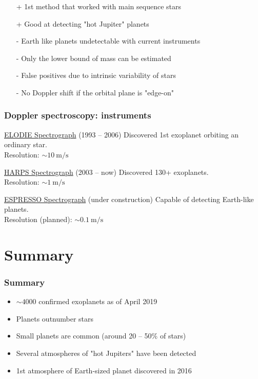 \documentclass{beamer}
\begin{document}
\begin{frame}
\begin{itemize}
\item[+] 1st method that worked with main sequence stars
\item[+] Good at detecting "hot Jupiter" planets
\item[-] Earth like planets undetectable with current instruments
\item[-] Only the lower bound of mass can be estimated
\item[-] False positives due to intrinsic variability of stars
\item[-] No Doppler shift if the orbital plane is "edge-on"
\end{itemize}
\end{frame}

\begin{frame}
\frametitle{Doppler spectroscopy: instruments}
\begin{block}{\href{http://www.obs-hp.fr/guide/elodie/elodie-eng.html}{ELODIE Spectrograph} (1993 -- 2006)}
Discovered 1st exoplanet orbiting an ordinary star. \\
Resolution: $\sim 10 \: \mathrm{m/s}$
\end{block}
\begin{block}{\href{https://www.eso.org/sci/facilities/lasilla/instruments/harps.html}{%
HARPS Spectrograph} (2003 -- now)}
Discovered 130+ exoplanets. \\
Resolution: $\sim 1 \: \mathrm{m/s}$
\end{block}
\begin{block}{\href{https://www.eso.org/sci/facilities/paranal/instruments/espresso.html}{%
ESPRESSO Spectrograph} (under construction)}
Capable of detecting Earth-like planets. \\
Resolution (planned): $\sim 0.1 \: \mathrm{m/s}$
\end{block}
\end{frame}

\section{Summary}
\begin{frame}
\frametitle{Summary}
\begin{itemize}
\item $\sim 4000$ confirmed exoplanets as of April 2019
\item Planets outnumber stars
\item Small planets are common (around 20 -- 50\% of stars)
\item Several atmospheres of "hot Jupiters" have been detected
\item 1st atmosphere of Earth-sized planet discovered in 2016 \cite{arXiv:1612.02425}
\end{itemize}
\end{frame}
\end{document}
